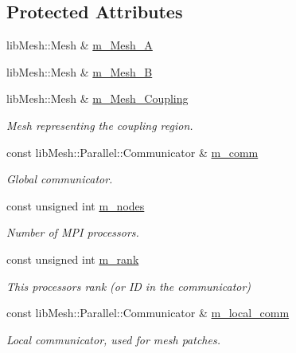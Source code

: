\subsection*{Protected Attributes}
\begin{DoxyCompactItemize}
\item 
lib\+Mesh\+::\+Mesh \& \hyperlink{classcarl_1_1_intersection___search_a903b7b3a369ed2c1e80d6a20ba41d350}{m\+\_\+\+Mesh\+\_\+\+A}
\item 
lib\+Mesh\+::\+Mesh \& \hyperlink{classcarl_1_1_intersection___search_a178cd617f59285fb858fddd78dec79d6}{m\+\_\+\+Mesh\+\_\+\+B}
\item 
lib\+Mesh\+::\+Mesh \& \hyperlink{classcarl_1_1_intersection___search_adb13a40afa6c1f8db7bb33f68c5b42d2}{m\+\_\+\+Mesh\+\_\+\+Coupling}
\begin{DoxyCompactList}\small\item\em Mesh representing the coupling region. \end{DoxyCompactList}\item 
const lib\+Mesh\+::\+Parallel\+::\+Communicator \& \hyperlink{classcarl_1_1_intersection___search_a69fe381ecd45f4cdcb4810294aa88eaa}{m\+\_\+comm}
\begin{DoxyCompactList}\small\item\em Global communicator. \end{DoxyCompactList}\item 
const unsigned int \hyperlink{classcarl_1_1_intersection___search_adcfd59960cfd05bc63e9bcf5a350a8ae}{m\+\_\+nodes}
\begin{DoxyCompactList}\small\item\em Number of M\+P\+I processors. \end{DoxyCompactList}\item 
const unsigned int \hyperlink{classcarl_1_1_intersection___search_a82564dfb7815673fcb9d9e3eb2d03b97}{m\+\_\+rank}
\begin{DoxyCompactList}\small\item\em This processor\textquotesingle{}s rank (or I\+D in the communicator) \end{DoxyCompactList}\item 
const lib\+Mesh\+::\+Parallel\+::\+Communicator \& \hyperlink{classcarl_1_1_intersection___search_a15b8deaf751e8d0fb91d8e7eed9aefb6}{m\+\_\+local\+\_\+comm}
\begin{DoxyCompactList}\small\item\em Local communicator, used for mesh patches. \end{DoxyCompactList}\item 

\end{DoxyCompactItemize}
